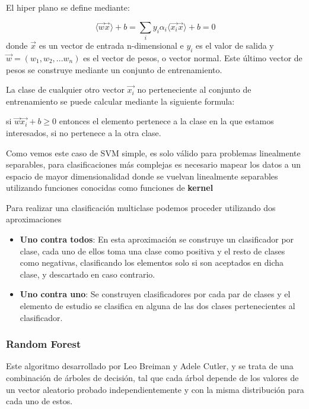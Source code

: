 El hiper plano se define mediante:

\begin{equation}
\langle\overrightarrow{w}\overrightarrow{x}\rangle + b = \sum_iy_i\alpha_i\langle\overrightarrow{x_i}\overrightarrow{x}\rangle + b = 0
\end{equation}
donde \(\overrightarrow{x}\) es un vector de entrada n-dimensional e \(y_i\) es el valor de salida y \(\overrightarrow{w} = (w_1,w_2,...w_n)\) es el vector de pesos, o vector normal. Este último vector de pesos se construye mediante un conjunto de entrenamiento.

La clase de cualquier otro vector \(\overrightarrow{x_i}\) no perteneciente al conjunto de entrenamiento se puede calcular mediante la siguiente formula:

si \(\overrightarrow{w}\overrightarrow{x_i}+b \ge 0\) entonces el elemento pertenece a la clase en la que estamos interesados, si no pertenece a la otra clase.

Como vemos este caso de SVM simple, es solo válido para problemas linealmente separables, para clasificaciones más complejas es necesario mapear los datos a un espacio de mayor dimensionalidad donde se vuelvan linealmente separables utilizando funciones conocidas como funciones de \textbf{kernel}

Para realizar una clasificación multiclase podemos proceder utilizando dos aproximaciones

\begin{itemize}
	\item \textbf{Uno contra todos}: En esta aproximación se construye un clasificador por clase, cada uno de ellos toma una clase como positiva y el resto de clases como negativas, clasificando los elementos solo si son aceptados en dicha clase, y descartado en caso contrario.
	\item \textbf{Uno contra uno}: Se construyen clasificadores por cada par de clases y el elemento de estudio se clasifica en alguna de las dos clases pertenecientes al clasificador.
\end{itemize}

\subsubsection{Random Forest}\label{rf}

Este algoritmo desarrollado por Leo Breiman y Adele Cutler, y se trata de una combinación de árboles de decisión, tal que cada árbol depende de los valores de un vector aleatorio probado independientemente y con la misma distribución para cada uno de estos.

